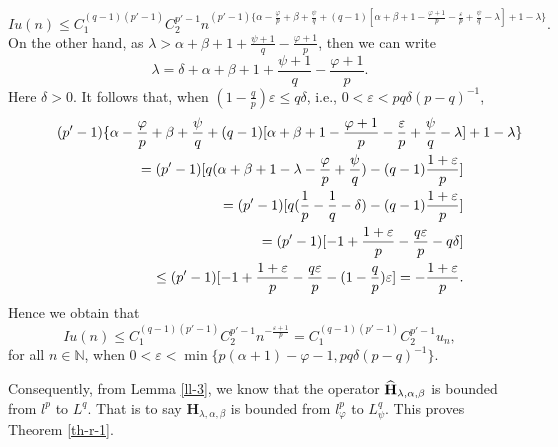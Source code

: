 \documentclass[10pt]{amsart}
\theoremstyle{definition}    %
\numberwithin{equation}{section}
\begin{document}
\begin{equation}
Iu(n)\leq C_1^{(q-1)(p'-1)}C_2^{p'-1}n^{(p'-1)\{\alpha-\frac{\varphi}{p}+\beta+\frac{\psi}{q}+(q-1)[\alpha+\beta+1-\frac{\varphi+1}{p}-\frac{\varepsilon}{p}+\frac{\psi}{q}-\lambda]+1-\lambda\}}.\nonumber
\end{equation}
On the other hand, as $\lambda>\alpha+\beta+1+\frac{\psi+1}{q}-\frac{\varphi+1}{p}$, then we can write
$$\lambda=\delta+\alpha+\beta+1+\frac{\psi+1}{q}-\frac{\varphi+1}{p}.$$
Here $\delta>0$. It follows that, when $(1-\frac{q}{p})\varepsilon \leq q\delta$, i.e., $0<\varepsilon<pq\delta(p-q)^{-1}$,
\begin{eqnarray}
\lefteqn{(p'-1)\{\alpha-\frac{\varphi}{p}+\beta+\frac{\psi}{q}+(q-1)[\alpha+\beta+1-\frac{\varphi+1}{p}-\frac{\varepsilon}{p}+\frac{\psi}{q}-\lambda]+1-\lambda\}} \nonumber
\\
&&\qquad\qquad\quad=(p'-1)[q(\alpha+\beta+1-\lambda-\frac{\varphi}{p}+\frac{\psi}{q})-(q-1)\frac{1+\varepsilon}{p}] \nonumber \\
&&\qquad\qquad\quad=(p'-1)[q(\frac{1}{p}-\frac{1}{q}-\delta)-(q-1)\frac{1+\varepsilon}{p}]\nonumber \\
&&\qquad\qquad\quad=(p'-1)[-1+\frac{1+\varepsilon}{p}-\frac{q\varepsilon}{p}-q\delta]\nonumber \\
&&\qquad\qquad\quad\leq (p'-1)[-1+\frac{1+\varepsilon}{p}-\frac{q\varepsilon}{p}-(1-\frac{q}{p})\varepsilon]=-\frac{1+\varepsilon}{p}.\nonumber\end{eqnarray}
Hence we obtain that
$$ 
Iu(n)\leq C_1^{(q-1)(p'-1)}C_2^{p'-1}n^{-\frac{\varepsilon+1}{p}}=C_1^{(q-1)(p'-1)}C_2^{p'-1}u_n, 
$$
for all $n\in \mathbb{N}$, when $0<\varepsilon<\min\{p(\alpha+1)-\varphi-1,pq\delta(p-q)^{-1}\}.$

Consequently, from Lemma \ref{ll-3}, we know that the operator $\widehat{{\bf H}}_{\lambda, \alpha, \beta}$ is bounded from $l^{p}$ to $L^{q}$. That is to say  $\mathbf{H}_{\lambda, \alpha, \beta}$ is bounded from $l_{\varphi}^{p}$ to $L_{\psi}^{q}$.
This proves Theorem \ref{th-r-1}.
\end{document}
